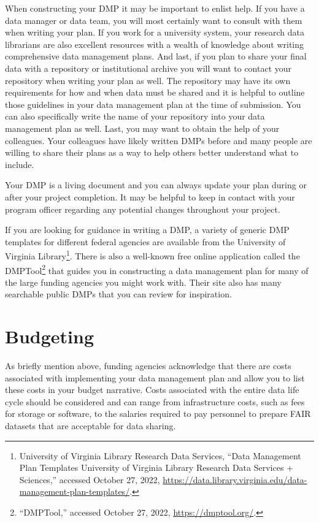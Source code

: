 \documentclass[
]{book}
\begin{document}
When constructing your DMP it may be important to enlist help. If you have a data manager or data team, you will most certainly want to consult with them when writing your plan. If you work for a university system, your research data librarians are also excellent resources with a wealth of knowledge about writing comprehensive data management plans. And last, if you plan to share your final data with a repository or institutional archive you will want to contact your repository when writing your plan as well. The repository may have its own requirements for how and when data must be shared and it is helpful to outline those guidelines in your data management plan at the time of submission. You can also specifically write the name of your repository into your data management plan as well. Last, you may want to obtain the help of your colleagues. Your colleagues have likely written DMPs before and many people are willing to share their plans as a way to help others better understand what to include.

Your DMP is a living document and you can always update your plan during or after your project completion. It may be helpful to keep in contact with your program officer regarding any potential changes throughout your project.

If you are looking for guidance in writing a DMP, a variety of generic DMP templates for different federal agencies are available from the University of Virginia Library\footnote{University of Virginia Library Research Data Services, {``Data Management Plan Templates {\textbar} University of Virginia Library Research Data Services + Sciences,''} accessed October 27, 2022, \url{https://data.library.virginia.edu/data-management-plan-templates/}.}. There is also a well-known free online application called the DMPTool\footnote{{``{DMPTool},''} accessed October 27, 2022, \url{https://dmptool.org/}.} that guides you in constructing a data management plan for many of the large funding agencies you might work with. Their site also has many searchable public DMPs that you can review for inspiration.

\hypertarget{budgeting}{%
\section{Budgeting}\label{budgeting}}

As briefly mention above, funding agencies acknowledge that there are costs associated with implementing your data management plan and allow you to list these costs in your budget narrative. Costs associated with the entire data life cycle should be considered and can range from infrastructure costs, such as fees for storage or software, to the salaries required to pay personnel to prepare FAIR datasets that are acceptable for data sharing.
\end{document}
